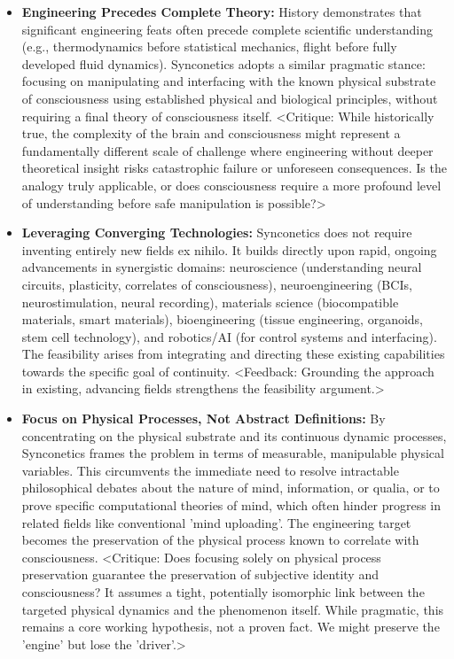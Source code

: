 \documentclass[10pt]{article}
\begin{document}
\begin{sloppypar}
  \begin{itemize}
    \item \textbf{Engineering Precedes Complete Theory:} History demonstrates that significant engineering feats often precede complete scientific understanding (e.g., thermodynamics before statistical mechanics, flight before fully developed fluid dynamics). Synconetics adopts a similar pragmatic stance: focusing on manipulating and interfacing with the known physical substrate of consciousness using established physical and biological principles, without requiring a final theory of consciousness itself. <Critique: While historically true, the complexity of the brain and consciousness might represent a fundamentally different scale of challenge where engineering without deeper theoretical insight risks catastrophic failure or unforeseen consequences. Is the analogy truly applicable, or does consciousness require a more profound level of understanding before safe manipulation is possible?>

    \item \textbf{Leveraging Converging Technologies:} Synconetics does not require inventing entirely new fields ex nihilo. It builds directly upon rapid, ongoing advancements in synergistic domains: neuroscience (understanding neural circuits, plasticity, correlates of consciousness), neuroengineering (BCIs, neurostimulation, neural recording), materials science (biocompatible materials, smart materials), bioengineering (tissue engineering, organoids, stem cell technology), and robotics/AI (for control systems and interfacing). The feasibility arises from integrating and directing these existing capabilities towards the specific goal of continuity. <Feedback: Grounding the approach in existing, advancing fields strengthens the feasibility argument.>

    \item \textbf{Focus on Physical Processes, Not Abstract Definitions:} By concentrating on the physical substrate and its continuous dynamic processes, Synconetics frames the problem in terms of measurable, manipulable physical variables. This circumvents the immediate need to resolve intractable philosophical debates about the nature of mind, information, or qualia, or to prove specific computational theories of mind, which often hinder progress in related fields like conventional 'mind uploading'. The engineering target becomes the preservation of the physical process known to correlate with consciousness. <Critique: Does focusing solely on physical process preservation guarantee the preservation of subjective identity and consciousness? It assumes a tight, potentially isomorphic link between the targeted physical dynamics and the phenomenon itself. While pragmatic, this remains a core working hypothesis, not a proven fact. We might preserve the 'engine' but lose the 'driver'.>


\end{itemize}
\end{sloppypar}
\end{document}

